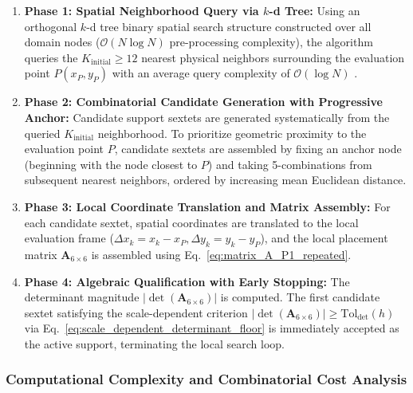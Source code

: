 \documentclass[preprint,12pt]{elsarticle}
\begin{document}
\begin{enumerate}
    \item \textbf{Phase 1: Spatial Neighborhood Query via $k$-d Tree:} Using an orthogonal $k$-d tree binary spatial search structure constructed over all domain nodes ($\mathcal{O}(N \log N)$ pre-processing complexity), the algorithm queries the $K_{\mathrm{initial}} \ge 12$ nearest physical neighbors surrounding the evaluation point $P(x_P, y_P)$ with an average query complexity of $\mathcal{O}(\log N)$ \cite{bentley1975multidimensional, parreira2006efficient, fasshauer2007meshfree}.
    
    \item \textbf{Phase 2: Combinatorial Candidate Generation with Progressive Anchor:} Candidate support sextets are generated systematically from the queried $K_{\mathrm{initial}}$ neighborhood. To prioritize geometric proximity to the evaluation point $P$, candidate sextets are assembled by fixing an anchor node (beginning with the node closest to $P$) and taking 5-combinations from subsequent nearest neighbors, ordered by increasing mean Euclidean distance.
    
    \item \textbf{Phase 3: Local Coordinate Translation and Matrix Assembly:} For each candidate sextet, spatial coordinates are translated to the local evaluation frame ($\Delta x_k = x_k - x_P, \Delta y_k = y_k - y_P$), and the local placement matrix $\mathbf{A}_{6 \times 6}$ is assembled using Eq.~\eqref{eq:matrix_A_P1_repeated}.
    
    \item \textbf{Phase 4: Algebraic Qualification with Early Stopping:} The determinant magnitude $|\det(\mathbf{A}_{6\times6})|$ is computed. The first candidate sextet satisfying the scale-dependent criterion $|\det(\mathbf{A}_{6\times6})| \ge \mathrm{Tol}_{\mathrm{det}}(h)$ via Eq.~\eqref{eq:scale_dependent_determinant_floor} is immediately accepted as the active support, terminating the local search loop.
\end{enumerate}

\subsubsection{Computational Complexity and Combinatorial Cost Analysis}
\label{subsubsec:computational_complexity}
\end{document}
